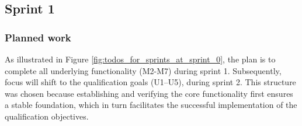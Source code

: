 \subsection{Sprint 1}

\subsubsection{Planned work}

As illustrated in Figure \ref{fig:todos_for_sprints_at_sprint_0}, the plan is to complete all underlying functionality (M2-M7) during sprint 1.
Subsequently, focus will shift to the qualification goals (U1–U5), during sprint 2. This structure was chosen because establishing and verifying the core functionality 
first ensures a stable foundation, which in turn facilitates the successful implementation of the qualification objectives.

